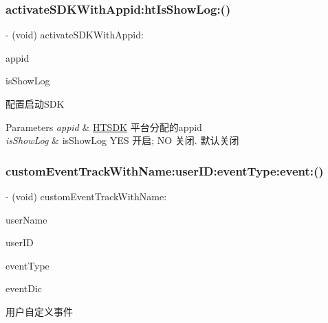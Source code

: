 \subsubsection{\texorpdfstring{activate\+S\+D\+K\+With\+Appid\+:ht\+Is\+Show\+Log\+:()}{activateSDKWithAppid:htIsShowLog:()}}
{\footnotesize\ttfamily -\/ (void) activate\+S\+D\+K\+With\+Appid\+: \begin{DoxyParamCaption}\item[{(N\+S\+String $\ast$)}]{appid }\item[{htIsShowLog:(B\+O\+OL)}]{is\+Show\+Log }\end{DoxyParamCaption}}

配置启动\+S\+DK


\begin{DoxyParams}{Parameters}
{\em appid} & \mbox{\hyperlink{interface_h_t_s_d_k}{H\+T\+S\+DK}} 平台分配的appid \\
\hline
{\em is\+Show\+Log} & is\+Show\+Log Y\+ES 开启; NO 关闭. 默认关闭 \\
\hline
\end{DoxyParams}
\mbox{\label{interface_h_t_s_d_k_a9dc6d7fd058584073bfcf843a33c9d08}} 
\subsubsection{\texorpdfstring{custom\+Event\+Track\+With\+Name\+:user\+I\+D\+:event\+Type\+:event\+:()}{customEventTrackWithName:userID:eventType:event:()}}
{\footnotesize\ttfamily -\/ (void) custom\+Event\+Track\+With\+Name\+: \begin{DoxyParamCaption}\item[{(N\+S\+String $\ast$)}]{user\+Name }\item[{userID:(N\+S\+String $\ast$)}]{user\+ID }\item[{eventType:(N\+S\+String $\ast$)}]{event\+Type }\item[{event:(N\+S\+Dictionary $\ast$)}]{event\+Dic }\end{DoxyParamCaption}}

用户自定义事件


